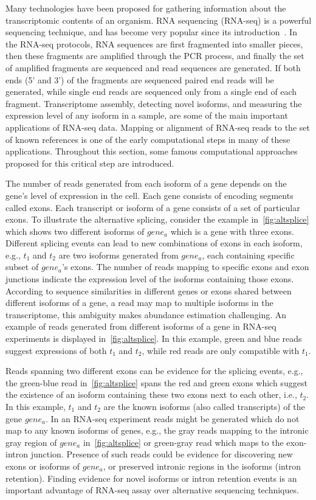 Many technologies have been proposed for gathering information about 
the transcriptomic contents of an organism. RNA sequencing (RNA-seq) is a 
powerful sequencing technique, and has become very popular since its 
introduction~\citep{mortazavi}. In the RNA-seq protocols, RNA sequences are 
first fragmented into smaller pieces, then these fragments are amplified 
through the PCR process, and finally the set of amplified fragments are 
sequenced and read sequences are generated. If both ends (5' and 3') of the 
fragments are sequenced paired end reads will be generated, while single 
end reads are sequenced only from a single end of each fragment.
Transcriptome assembly, detecting novel isoforms, and measuring the 
expression level of any isoform in a sample, are some of the main 
important applications of RNA-seq data. Mapping or alignment of RNA-seq 
reads to the set of known references is one of the early computational 
steps in many of these applications. Throughout this section, some famous 
computational approaches proposed for this critical step are introduced.


The number of reads generated from each isoform of a gene depends on 
the 
gene's level of expression in the cell. Each gene consists of encoding 
segments called exons. Each transcript or isoform of a gene consists of 
a set of particular exons. To illustrate the alternative splicing, consider 
the example in~\cref{fig:altsplice} which shows two different isoforms of 
$gene_a$ which is a gene with three exons. Different splicing events can 
lead to new combinations of exons in each isoform, e.g., $t_1$ and $t_2$ 
are two isoforms generated from $gene_a$, each containing specific subset 
of $gene_a$'s exons.
The number of reads mapping to specific exons and exon junctions indicate 
the expression level of the isoforms containing those exons. According to 
sequence similarities in different genes or exons shared between different 
isoforms of a gene, a read may map to multiple isoforms in the transcriptome, 
this ambiguity makes abundance estimation challenging. An example of reads 
generated from different isoforms of a gene in RNA-seq experiments is displayed 
in~\cref{fig:altsplice}. In this example, green and blue reads suggest 
expressions of both $t_1$ and $t_2$, while red reads are only compatible 
with $t_1$. 

Reads spanning two different exons can be evidence for the splicing events, 
e.g., the green-blue read in~\cref{fig:altsplice} spans the red and green 
exons which suggest the existence of an isoform containing these two exons 
next to each other, i.e., $t_2$. In this example, $t_1$ and $t_2$ are the 
known isoforms (also called transcripts) of the gene $gene_a$. In an RNA-seq 
experiment reads might be generated which do not map to any known isoforms of 
genes, e.g., the gray reads mapping to the intronic gray region of $gene_a$ 
in~\cref{fig:altsplice} or green-gray read which maps to the exon-intron 
junction. Presence of such reads could be evidence for discovering new exons 
or isoforms of $gene_a$, or preserved intronic regions in the isoforms (intron 
retention). Finding evidence for novel isoforms or intron retention events is 
an important advantage of RNA-seq assay over alternative sequencing techniques.


